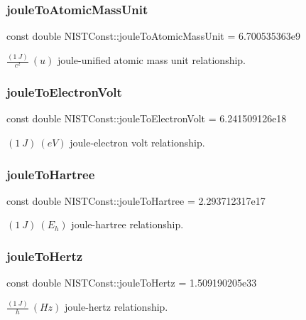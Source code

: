 \subsubsection{\texorpdfstring{joule\+To\+Atomic\+Mass\+Unit}{jouleToAtomicMassUnit}}
{\footnotesize\ttfamily const double N\+I\+S\+T\+Const\+::joule\+To\+Atomic\+Mass\+Unit = 6.\+700535363e9}

$\frac{(1\ J)}{c^2} \ (u)$ joule-\/unified atomic mass unit relationship. \mbox{\label{group___n_i_s_t_const-_joule_ga08ffcdfd701ba898a91b0cbdde4d0e2d}} 
\subsubsection{\texorpdfstring{joule\+To\+Electron\+Volt}{jouleToElectronVolt}}
{\footnotesize\ttfamily const double N\+I\+S\+T\+Const\+::joule\+To\+Electron\+Volt = 6.\+241509126e18}

$(1\ J) \ (eV)$ joule-\/electron volt relationship. \mbox{\label{group___n_i_s_t_const-_joule_gac067d2d31bf56c3abe63559dac6c00d7}} 
\subsubsection{\texorpdfstring{joule\+To\+Hartree}{jouleToHartree}}
{\footnotesize\ttfamily const double N\+I\+S\+T\+Const\+::joule\+To\+Hartree = 2.\+293712317e17}

$(1\ J) \ (E_h)$ joule-\/hartree relationship. \mbox{\label{group___n_i_s_t_const-_joule_ga6ac361417bc6b472bf80fcfef276d742}} 
\subsubsection{\texorpdfstring{joule\+To\+Hertz}{jouleToHertz}}
{\footnotesize\ttfamily const double N\+I\+S\+T\+Const\+::joule\+To\+Hertz = 1.\+509190205e33}

$\frac{(1\ J)}{h} \ (Hz)$ joule-\/hertz relationship. \mbox{\label{group___n_i_s_t_const-_joule_gaa8de9ad07a642c1b9c1d4ee15125a917}} 

